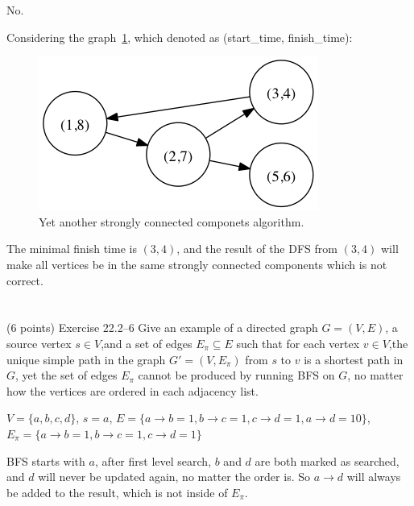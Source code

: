\documentclass[paper=a4, fontsize=11pt]{scrartcl} %
\begin{document}
No.

Considering the graph~\ref{fig:scc}, which denoted as (start\_time, finish\_time):

\begin{figure}[hp]
  \centering
  \includegraphics[width=.7\textwidth]{9-3.gv.png}
  \caption{Yet another strongly connected componets algorithm.}
\label{fig:scc}
\end{figure}

The minimal finish time is $(3,4)$, and the result of the DFS from
$(3,4)$ will make all vertices be in the same strongly connected
components which is not correct.

\pagebreak


\section{}

\begin{fancyquotes}
  (6 points) Exercise 22.2--6 Give an example of a directed graph
  $G=(V,E)$, a source vertex $s\in V$,and a set of edges $E_{\pi}\subseteq
  E$ such that for each vertex $v\in V$,the unique simple path in the
  graph $G'=(V,E_{\pi})$ from $s$ to $v$ is a shortest path in $G$,
  yet the set of edges $E_{\pi}$ cannot be produced by running BFS on
  $G$, no matter how the vertices are ordered in each adjacency list.
\end{fancyquotes}

$V=\{a,b,c,d\}$, $s = a$, $E = \{a\rightarrow b=1, b\rightarrow c=1,
c\rightarrow d=1, a\rightarrow d=10\}$, $E_\pi = \{a\rightarrow b=1,
b\rightarrow c=1, c\rightarrow d=1\}$

BFS starts with $a$, after first level search, $b$ and $d$ are both
marked as searched, and $d$ will never be updated again, no matter the
order is. So $a\rightarrow d$ will always be added to the result,
which is not inside of $E_\pi$.

\pagebreak
\end{document}
